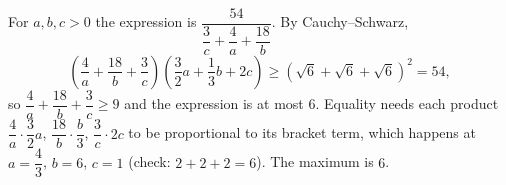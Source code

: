 For $a,b,c>0$ the expression is $\dfrac{54}{\dfrac3c+\dfrac4a+\dfrac{18}b}$. By Cauchy--Schwarz,
\[\left(\dfrac4a+\dfrac{18}b+\dfrac3c\right)\left(\dfrac32a+\dfrac13b+2c\right)\ge\left(\sqrt6+\sqrt6+\sqrt6\right)^2=54,\]
so $\dfrac4a+\dfrac{18}b+\dfrac3c\ge9$ and the expression is at most $6$. Equality needs each product $\dfrac4a\cdot\dfrac32a$, $\dfrac{18}b\cdot\dfrac b3$, $\dfrac3c\cdot2c$ to be proportional to its bracket term, which happens at $a=\dfrac43$, $b=6$, $c=1$ (check: $2+2+2=6$). The maximum is $\boxed{6}$.
